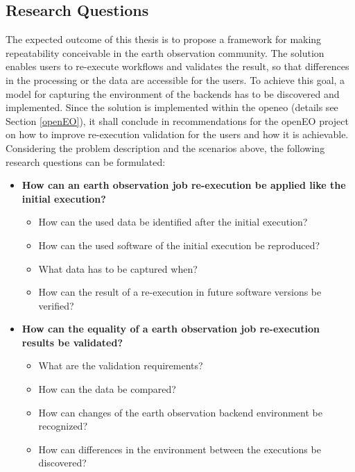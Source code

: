 \documentclass[draft,final]{vutinfth} %
\begin{document}
\subsection{Research Questions}\label{research question}
The expected outcome of this thesis is to propose a framework for making repeatability conceivable in the earth observation community. The solution enables users to re-execute workflows and validates the result, so that differences in the processing or the data are accessible for the users. To achieve this goal, a model for capturing the environment of the backends has to be discovered and implemented. Since the solution is implemented within the \gls{openeo} (details see Section \ref{openEO}), it shall conclude in recommendations for the openEO project on how to improve re-execution validation for the users and how it is achievable. Considering the problem description and the scenarios above, the following research questions can be formulated:

\begin{itemize}
	\item \textbf{How can an earth observation job re-execution be applied like the initial execution?}
	\begin{itemize}
		\item How can the used data be identified after the initial execution?
		\item How can the used software of the initial execution be reproduced?
		\item What data has to be captured when?
		\item How can the result of a re-execution in future software versions be verified?
	\end{itemize}
	\item \textbf{How can the equality of a earth observation job re-execution results be validated?}
	\begin{itemize}
		\item What are the validation requirements?
		\item How can the data be compared?
		\item How can changes of the earth observation backend environment be recognized?
		\item How can differences in the environment between the executions be discovered?
	\end{itemize}
\end{itemize}
\end{document}
